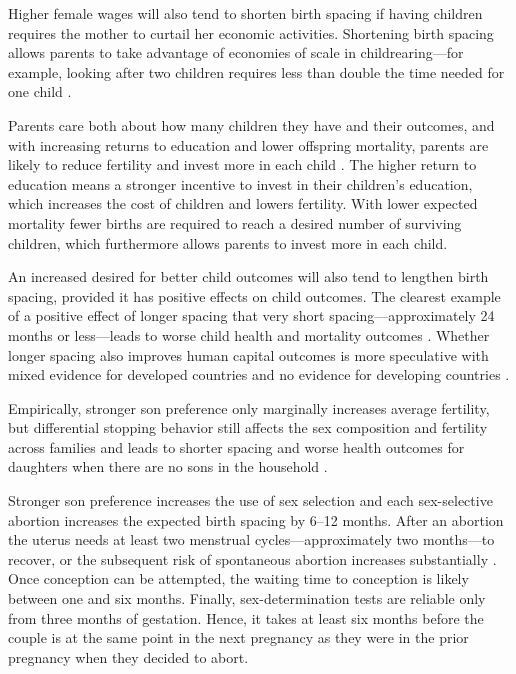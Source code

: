 \documentclass[12pt,letterpaper]{article}
\begin{document}
Higher female wages will also tend to shorten birth spacing if having children requires 
the mother to curtail her economic activities.
Shortening birth spacing allows parents to take advantage of economies of scale in 
childrearing---for example, looking after two children requires less than double the time 
needed for one child \citep{Vijverberg1982,Hotz1997}.

Parents care both about how many children they have and their outcomes, and with 
increasing returns to education and lower offspring mortality, parents are likely to 
reduce fertility and invest more in each child \citep{Rosenzweig1982a,Wolpin1997}.
The higher return to education means a stronger incentive to invest in their children's
education, which increases the cost of children and lowers fertility. 
With lower expected mortality fewer births are required to reach a desired number 
of surviving children, which furthermore allows parents to invest more in each child.

An increased desired for better child outcomes will also tend to lengthen birth spacing,
provided it has positive effects on child outcomes.
The clearest example of a positive effect of longer spacing that very short 
spacing---approximately 24 months or less---leads to worse child health and mortality 
outcomes \citep{Whitworth2002,Conde-Agudelo2012}.
Whether longer spacing also improves human capital outcomes is more speculative with
mixed evidence for developed countries and no evidence for developing countries
\citep{Zajonc1976,Powell1993,Pettersson-Lidbom2009,Buckles2012,Barclay2017}.

Empirically, stronger son preference only marginally increases average fertility, but
differential stopping behavior still affects the sex composition and fertility across 
families and leads to shorter spacing and worse health outcomes for daughters  
when there are no sons in the household
\citep{repetto72,clark00,Whitworth2002,Basu2010,Jayachandran2011,Barcellos2014}.
 
Stronger son preference increases the use of sex selection and each sex-selective
abortion increases the expected birth spacing by 6--12 months.
After an abortion the uterus needs at least two menstrual cycles---approximately 
two months---to recover, or the subsequent risk of spontaneous abortion increases 
substantially \citep{zhou00b}.
Once conception can be attempted, the waiting time to conception is likely between
one and six months. 
Finally, sex-determination tests are reliable only from three months of gestation. 
Hence, it takes at least six months before the couple is at the same point in the next 
pregnancy as they were in the prior pregnancy when they decided to abort.
\end{document}

